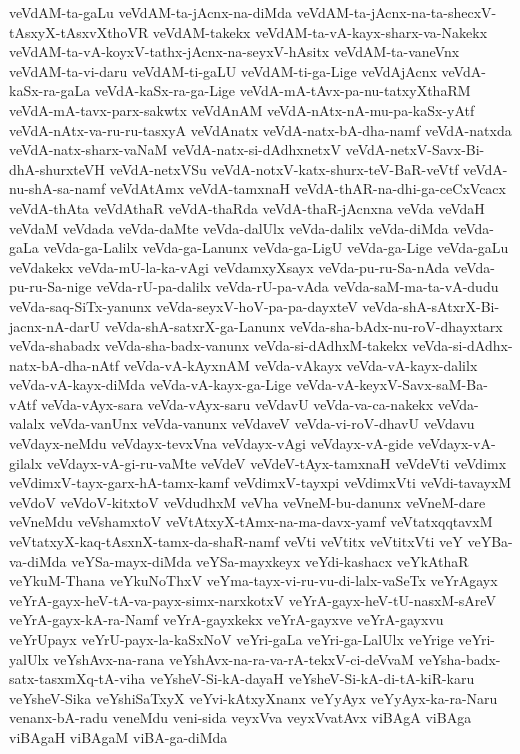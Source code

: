 {veVdAM-ta-gaLu
veVdAM-ta-jAcnx-na-diMda
veVdAM-ta-jAcnx-na-ta-shecxV-tAsxyX-tAsxvXthoVR
veVdAM-takekx
veVdAM-ta-vA-kayx-sharx-va-Nakekx
veVdAM-ta-vA-koyxV-tathx-jAcnx-na-seyxV-hAsitx
veVdAM-ta-vaneVnx
veVdAM-ta-vi-daru
veVdAM-ti-gaLU
veVdAM-ti-ga-Lige
veVdAjAcnx
veVdA-kaSx-ra-gaLa
veVdA-kaSx-ra-ga-Lige
veVdA-mA-tAvx-pa-nu-tatxyXthaRM
veVdA-mA-tavx-parx-sakwtx
veVdAnAM
veVdA-nAtx-nA-mu-pa-kaSx-yAtf
veVdA-nAtx-va-ru-ru-tasxyA
veVdAnatx
veVdA-natx-bA-dha-namf
veVdA-natxda
veVdA-natx-sharx-vaNaM
veVdA-natx-si-dAdhxnetxV
veVdA-netxV-Savx-Bi-dhA-shurxteVH
veVdA-netxVSu
veVdA-notxV-katx-shurx-teV-BaR-veVtf
veVdA-nu-shA-sa-namf
veVdAtAmx
veVdA-tamxnaH
veVdA-thAR-na-dhi-ga-ceCxVcacx
veVdA-thAta
veVdAthaR
veVdA-thaRda
veVdA-thaR-jAcnxna
veVda
veVdaH
veVdaM
veVdada
veVda-daMte
veVda-dalUlx
veVda-dalilx
veVda-diMda
veVda-gaLa
veVda-ga-Lalilx
veVda-ga-Lanunx
veVda-ga-LigU
veVda-ga-Lige
veVda-gaLu
veVdakekx
veVda-mU-la-ka-vAgi
veVdamxyXsayx
veVda-pu-ru-Sa-nAda
veVda-pu-ru-Sa-nige
veVda-rU-pa-dalilx
veVda-rU-pa-vAda
veVda-saM-ma-ta-vA-dudu
veVda-saq-SiTx-yanunx
veVda-seyxV-hoV-pa-pa-dayxteV
veVda-shA-sAtxrX-Bi-jacnx-nA-darU
veVda-shA-satxrX-ga-Lanunx
veVda-sha-bAdx-nu-roV-dhayxtarx
veVda-shabadx
veVda-sha-badx-vanunx
veVda-si-dAdhxM-takekx
veVda-si-dAdhx-natx-bA-dha-nAtf
veVda-vA-kAyxnAM
veVda-vAkayx
veVda-vA-kayx-dalilx
veVda-vA-kayx-diMda
veVda-vA-kayx-ga-Lige
veVda-vA-keyxV-Savx-saM-Ba-vAtf
veVda-vAyx-sara
veVda-vAyx-saru
veVdavU
veVda-va-ca-nakekx
veVda-valalx
veVda-vanUnx
veVda-vanunx
veVdaveV
veVda-vi-roV-dhavU
veVdavu
veVdayx-neMdu
veVdayx-tevxVna
veVdayx-vAgi
veVdayx-vA-gide
veVdayx-vA-gilalx
veVdayx-vA-gi-ru-vaMte
veVdeV
veVdeV-tAyx-tamxnaH
veVdeVti
veVdimx
veVdimxV-tayx-garx-hA-tamx-kamf
veVdimxV-tayxpi
veVdimxVti
veVdi-tavayxM
veVdoV
veVdoV-kitxtoV
veVdudhxM
veVha
veVneM-bu-danunx
veVneM-dare
veVneMdu
veVshamxtoV
veVtAtxyX-tAmx-na-ma-davx-yamf
veVtatxqqtavxM
veVtatxyX-kaq-tAsxnX-tamx-da-shaR-namf
veVti
veVtitx
veVtitxVti
veY
veYBa-va-diMda
veYSa-mayx-diMda
veYSa-mayxkeyx
veYdi-kashacx
veYkAthaR
veYkuM-Thana
veYkuNoThxV
veYma-tayx-vi-ru-vu-di-lalx-vaSeTx
veYrAgayx
veYrA-gayx-heV-tA-va-payx-simx-narxkotxV
veYrA-gayx-heV-tU-nasxM-sAreV
veYrA-gayx-kA-ra-Namf
veYrA-gayxkekx
veYrA-gayxve
veYrA-gayxvu
veYrUpayx
veYrU-payx-la-kaSxNoV
veYri-gaLa
veYri-ga-LalUlx
veYrige
veYri-yalUlx
veYshAvx-na-rana
veYshAvx-na-ra-va-rA-tekxV-ci-deVvaM
veYsha-badx-satx-tasxmXq-tA-viha
veYsheV-Si-kA-dayaH
veYsheV-Si-kA-di-tA-kiR-karu
veYsheV-Sika
veYshiSaTxyX
veYvi-kAtxyXnanx
veYyAyx
veYyAyx-ka-ra-Naru
venanx-bA-radu
veneMdu
veni-sida
veyxVva
veyxVvatAvx
viBAgA
viBAga
viBAgaH
viBAgaM
viBA-ga-diMda
}
